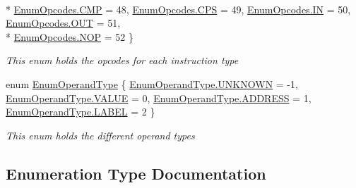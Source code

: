 \begin{DoxyCompactItemize}
\\*
\hyperlink{namespace_c_p_u___o_s___simulator_1_1_c_p_u_ac29c87bff87ad404c953b2581024043ea5cbc764daeacd3be7f410f42511c1edb}{Enum\+Opcodes.\+C\+M\+P} = 48, 
\hyperlink{namespace_c_p_u___o_s___simulator_1_1_c_p_u_ac29c87bff87ad404c953b2581024043eaad26b36ed4daec9b20ee600e0876f367}{Enum\+Opcodes.\+C\+P\+S} = 49, 
\hyperlink{namespace_c_p_u___o_s___simulator_1_1_c_p_u_ac29c87bff87ad404c953b2581024043eac86ee0d9d7ed3e7b4fdbf486fa6c0ebb}{Enum\+Opcodes.\+I\+N} = 50, 
\hyperlink{namespace_c_p_u___o_s___simulator_1_1_c_p_u_ac29c87bff87ad404c953b2581024043eaef373774188a51f80463f37b6bd9e83a}{Enum\+Opcodes.\+O\+U\+T} = 51, 
\\*
\hyperlink{namespace_c_p_u___o_s___simulator_1_1_c_p_u_ac29c87bff87ad404c953b2581024043ea1a004f5abe2b334db21328be1ea6b593}{Enum\+Opcodes.\+N\+O\+P} = 52
 \}\begin{DoxyCompactList}\small\item\em This enum holds the opcodes for each instruction type \end{DoxyCompactList}
\item 
enum \hyperlink{namespace_c_p_u___o_s___simulator_1_1_c_p_u_ad49cfe442b74115a326c03b7ae848f76}{Enum\+Operand\+Type} \{ \hyperlink{namespace_c_p_u___o_s___simulator_1_1_c_p_u_ad49cfe442b74115a326c03b7ae848f76a696b031073e74bf2cb98e5ef201d4aa3}{Enum\+Operand\+Type.\+U\+N\+K\+N\+O\+W\+N} = -\/1, 
\hyperlink{namespace_c_p_u___o_s___simulator_1_1_c_p_u_ad49cfe442b74115a326c03b7ae848f76aecc2e9c313faddb07e7da223c1dc5c3f}{Enum\+Operand\+Type.\+V\+A\+L\+U\+E} = 0, 
\hyperlink{namespace_c_p_u___o_s___simulator_1_1_c_p_u_ad49cfe442b74115a326c03b7ae848f76a2664f03ac6b8bb9eee4287720e407db3}{Enum\+Operand\+Type.\+A\+D\+D\+R\+E\+S\+S} = 1, 
\hyperlink{namespace_c_p_u___o_s___simulator_1_1_c_p_u_ad49cfe442b74115a326c03b7ae848f76a6f434c508ad901b8667ed22f713e52bb}{Enum\+Operand\+Type.\+L\+A\+B\+E\+L} = 2
 \}\begin{DoxyCompactList}\small\item\em This enum holds the different operand types \end{DoxyCompactList}
\end{DoxyCompactItemize}


\subsection{Enumeration Type Documentation}
\hypertarget{namespace_c_p_u___o_s___simulator_1_1_c_p_u_ab76721f84dabbc14c907e6f11fbeb7c0}{}

